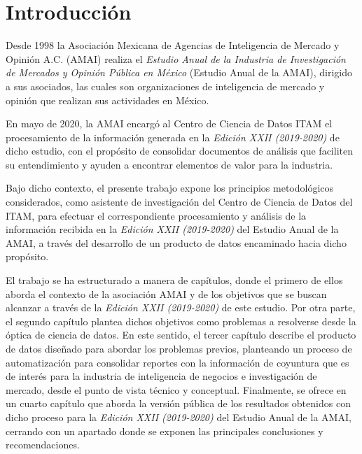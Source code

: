 \chapter*{Introducción}


\noindent Desde 1998 la Asociación Mexicana de Agencias de Inteligencia de Mercado y Opinión A.C. (AMAI) realiza el \emph{Estudio Anual de la Industria de Investigación de Mercados y Opinión Pública en México} (Estudio Anual de la AMAI), dirigido a sus asociados, las cuales son organizaciones de inteligencia de mercado y opinión que realizan sus actividades en México.

En mayo de 2020, la AMAI encargó al Centro de Ciencia de Datos ITAM el procesamiento de la información generada en la \emph{Edición XXII (2019-2020)} de dicho estudio, con el propósito de consolidar documentos de análisis que faciliten su entendimiento y ayuden a encontrar elementos de valor para la industria.

Bajo dicho contexto, el presente trabajo expone los principios metodológicos considerados, como asistente de investigación del Centro de Ciencia de Datos del ITAM, para efectuar el correspondiente procesamiento y análisis de la información recibida en la \emph{Edición XXII (2019-2020)} del Estudio Anual de la AMAI, a través del desarrollo de un producto de datos encaminado hacia dicho propósito.

El trabajo se ha estructurado a manera de capítulos, donde el primero de ellos aborda el contexto de la asociación AMAI y de los objetivos que se buscan alcanzar a través  de la \emph{Edición XXII (2019-2020)} de este estudio. Por otra parte, el segundo capítulo plantea dichos objetivos como problemas  a  resolverse desde  la  óptica  de  ciencia  de  datos. En este sentido, el tercer capítulo describe el producto de datos diseñado para abordar los problemas previos, planteando un proceso de automatización para consolidar reportes con la información de coyuntura que es de interés para la industria de inteligencia de negocios e investigación de mercado, desde el punto de vista técnico y conceptual. Finalmente, se ofrece en un cuarto capítulo que aborda la versión pública de los resultados obtenidos con dicho proceso para la \emph{Edición XXII (2019-2020)} del Estudio Anual de la AMAI, cerrando con un apartado donde se exponen las principales conclusiones y recomendaciones.

